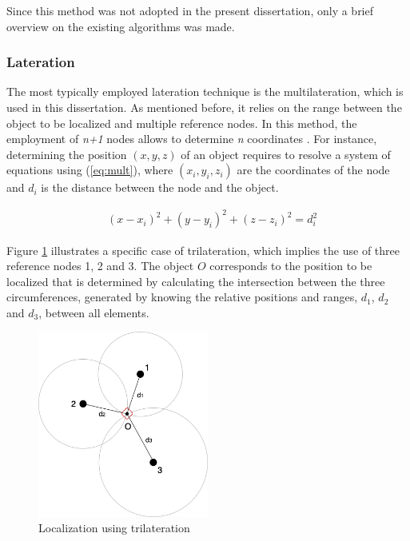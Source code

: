 Since this method was not adopted in the present dissertation, only a brief overview on the existing algorithms was made.

\subsubsection{Lateration} \label{subsubsec:lateration}

The most typically employed lateration technique is the multilateration, which is used in this dissertation. As mentioned before, it relies on the range between the object to be localized and multiple reference nodes. In this method, the employment of \textit{n+1} nodes allows to determine \textit{n} coordinates \cite{arch_localiz}. For instance, determining the position $(x,y,z)$ of an object requires to resolve a system of equations using (\ref{eq:mult}), where $(x_{i}, y_{i}, z_{i})$ are the coordinates of the node and $d_{i}$ is the distance between the node and the object.

\begin{eqnarray}
	& (x - x_{i})^2 + (y - y_{i})^2 + (z - z_{i})^2 = d_{i}^2 
	\label{eq:mult}
\end{eqnarray}

Figure \ref{fig:trilateration} illustrates a specific case of trilateration, which implies the use of three reference nodes 1, 2 and 3. The object $O$ corresponds to the position to be localized that is determined by calculating the intersection between the three circumferences, generated by knowing the relative positions and ranges, $d_1$, $d_2$ and $d_3$, between all elements.

\begin{figure}[!htbp]
	\centering
	\includegraphics[width=0.5\textwidth]{figures/trilateration}
	\caption{Localization using trilateration}
	\label{fig:trilateration}
\end{figure}

